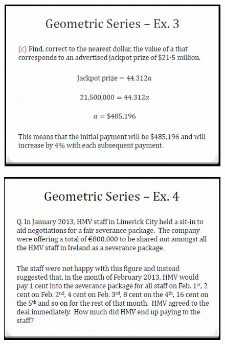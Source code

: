 \documentclass{beamer}
\begin{document}
\begin{frame}
	\begin{figure}
		\centering
		\includegraphics[width=0.99\linewidth]{SeqSer20E}
	\end{figure}
	
\end{frame}	
\begin{frame}
	\begin{figure}
		\centering
		\includegraphics[width=0.99\linewidth]{SeqSer20F}
	\end{figure}
	
\end{frame}
\end{document}
